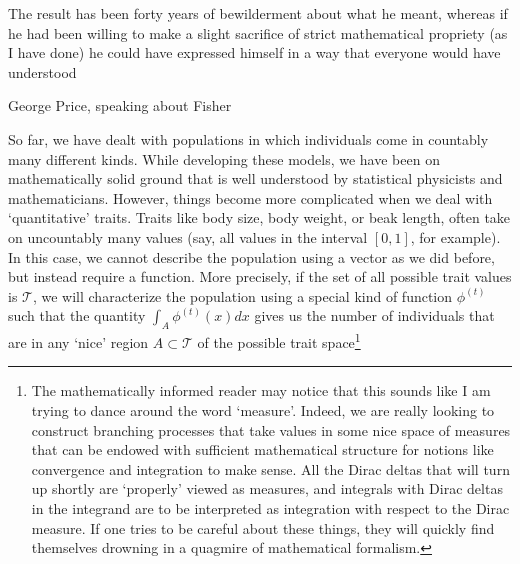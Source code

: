 \epigraph{\justifying The result has been forty years of bewilderment about what he meant, whereas if he had been willing to make a slight sacrifice of strict mathematical propriety (as I have done) he could have expressed himself in a way that everyone would have understood}{George Price, speaking about Fisher~\citep{price_fishers_1972}}


So far, we have dealt with populations in which individuals come in countably many different kinds. While developing these models, we have been on mathematically solid ground that is well understood by statistical physicists and mathematicians. However, things become more complicated when we deal with `quantitative' traits. Traits like body size, body weight, or beak length, often take on uncountably many values (say, all values in the interval $[0,1]$, for example). In this case, we cannot describe the population using a vector as we did before, but instead require a function. More precisely, if the set of all possible trait values is $\mathcal{T}$, we will characterize the population using a special kind of function $\phi^{(t)}$ such that the quantity $\int_{A}\phi^{(t)}(x)dx$ gives us the number of individuals that are in any `nice' region $A \subset \mathcal{T}$ of the possible trait space\footnote{The mathematically informed reader may notice that this sounds like I am trying to dance around the word `measure'. Indeed, we are really looking to construct branching processes that take values in some nice space of measures that can be endowed with sufficient mathematical structure for notions like convergence and integration to make sense. All the Dirac deltas that will turn up shortly are `properly' viewed as measures, and integrals with Dirac deltas in the integrand are to be interpreted as integration with respect to the Dirac measure. If one tries to be careful about these things, they will quickly find themselves drowning in a quagmire of mathematical formalism.
}
